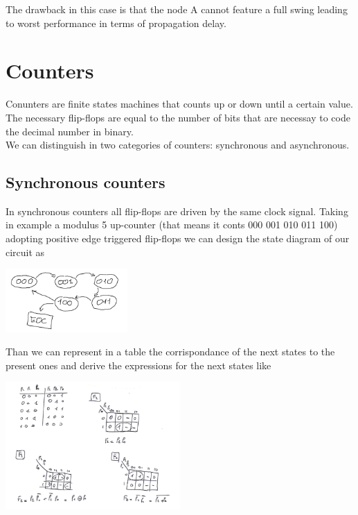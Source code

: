 The drawback in this case is that the node A cannot feature a full swing leading to worst performance in terms of propagation delay.\\

\section{Counters}
Conunters are finite states machines that counts up or down until a certain value.\\
The necessary flip-flops are equal to the number of bits that are necessay to code the decimal number in binary.\\
We can distinguish in two categories of counters: synchronous and asynchronous.\\

\subsection{Synchronous counters}
In synchronous counters all flip-flops are driven by the same clock signal. Taking in example a modulus 5 up-counter (that means it conts 000 001 010 011 100) adopting positive edge triggered flip-flops we can design the state diagram of our circuit as 

\centering
\includegraphics[width=0.35\textwidth]{C10_19.png}\\
\raggedright

Than we can represent in a table the corrispondance of the next states to the present ones and derive the expressions for the next states like

\centering
\includegraphics[width=0.5\textwidth]{C10_20.png}\\
\raggedright


